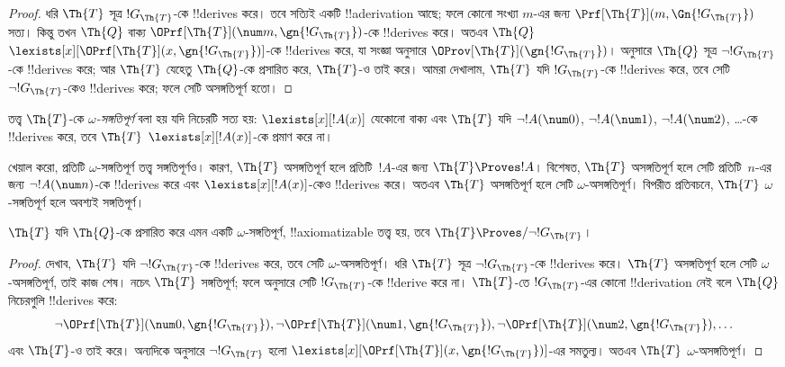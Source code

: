 \documentclass[../../../include/open-logic-section]{subfiles}
\begin{document}
\begin{proof}
ধরি $\Th{T}$ সূত্র $!G_\Th{T}$-কে !!{derive}s করে। তবে সত্যিই একটি
!!a{derivation} আছে; ফলে কোনো সংখ্যা $m$-এর জন্য
$\Prf[\Th{T}](m, \Gn{!G_\Th{T}})$ সত্য। কিন্তু তখন $\Th{Q}$ বাক্য
$\OPrf[\Th{T}](\num m, \gn{!G_\Th{T}})$-কে !!{derive}s করে। অতএব
$\Th{Q}$ $\lexists[x][\OPrf[\Th{T}](x,\gn{!G_\Th{T}})]$-কে !!{derive}s
করে, যা সংজ্ঞা অনুসারে $\OProv[\Th{T}](\gn{!G_\Th{T}})$।
 অনুসারে $\Th{Q}$ সূত্র $\lnot !G_\Th{T}$-কে !!{derive}s
করে; আর $\Th{T}$ যেহেতু $\Th{Q}$-কে প্রসারিত করে, $\Th{T}$-ও তাই করে।
আমরা দেখালাম, $\Th{T}$ যদি $!G_\Th{T}$-কে !!{derive}s করে, তবে সেটি
$\lnot !G_\Th{T}$-কেও !!{derive}s করে; ফলে সেটি অসঙ্গতিপূর্ণ হতো।
\end{proof}

\begin{defn}
তত্ত্ব $\Th{T}$-কে \emph{$\omega$-সঙ্গতিপূর্ণ} বলা হয় যদি নিচেরটি সত্য
হয়: $\lexists[x][!A(x)]$ যেকোনো বাক্য এবং $\Th{T}$ যদি $\lnot
!A(\num 0)$, $\lnot !A(\num 1)$, $\lnot !A(\num 2)$, \dots{}-কে
!!{derive}s করে, তবে $\Th{T}$ $\lexists[x][!A(x)]$-কে প্রমাণ করে না।
\end{defn}

খেয়াল করো, প্রতিটি $\omega$-সঙ্গতিপূর্ণ তত্ত্ব সঙ্গতিপূর্ণও। কারণ,
$\Th{T}$ অসঙ্গতিপূর্ণ হলে প্রতিটি~$!A$-এর জন্য $\Th{T} \Proves !A$।
বিশেষত, $\Th{T}$ অসঙ্গতিপূর্ণ হলে সেটি প্রতিটি~$n$-এর জন্য $\lnot
!A(\num n)$-কে !!{derive}s করে এবং $\lexists[x][!A(x)]$-কেও !!{derive}s
করে। অতএব $\Th{T}$ অসঙ্গতিপূর্ণ হলে সেটি $\omega$-অসঙ্গতিপূর্ণ। বিপরীত
প্রতিবচনে, $\Th{T}$ $\omega$-সঙ্গতিপূর্ণ হলে অবশ্যই সঙ্গতিপূর্ণ।

\begin{lem}
$\Th{T}$ যদি $\Th{Q}$-কে প্রসারিত করে এমন একটি $\omega$-সঙ্গতিপূর্ণ,
!!{axiomatizable} তত্ত্ব হয়, তবে $\Th{T} \Proves/ \lnot !G_\Th{T}$।
\end{lem}

\begin{proof}
দেখাব, $\Th{T}$ যদি $\lnot !G_\Th{T}$-কে !!{derive}s করে, তবে সেটি
$\omega$-অসঙ্গতিপূর্ণ। ধরি $\Th{T}$ সূত্র $\lnot !G_\Th{T}$-কে
!!{derive}s করে। $\Th{T}$ অসঙ্গতিপূর্ণ হলে সেটি $\omega$-অসঙ্গতিপূর্ণ,
তাই কাজ শেষ। নচেৎ $\Th{T}$ সঙ্গতিপূর্ণ; ফলে
 অনুসারে সেটি $!G_\Th{T}$-কে !!{derive} করে না।
$\Th{T}$-তে $!G_\Th{T}$-এর কোনো !!{derivation} নেই বলে $\Th{Q}$
নিচেরগুলি !!{derive}s করে:
\[
\lnot \OPrf[\Th{T}](\num 0, \gn{!G_\Th{T}}), \lnot \OPrf[\Th{T}](\num 1,
\gn{!G_\Th{T}}), \lnot \OPrf[\Th{T}](\num 2, \gn{!G_\Th{T}}), \dots
\]
এবং $\Th{T}$-ও তাই করে। অন্যদিকে  অনুসারে $\lnot
!G_\Th{T}$ হলো
$\lexists[x][\OPrf[\Th{T}](x,\gn{!G_\Th{T}})]$-এর সমতুল্য। অতএব
$\Th{T}$ $\omega$-অসঙ্গতিপূর্ণ।
\end{proof}
\end{document}
